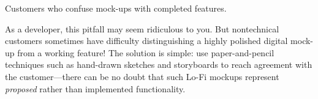 \begin{pitfall}{Customers who confuse mock-ups with completed features.}

As a developer, this pitfall may seem ridiculous to you.  But
nontechnical customers sometimes have difficulty distinguishing a highly
polished digital mock-up from a working feature!  The solution is simple: use
paper-and-pencil techniques such as hand-drawn sketches and storyboards to
reach agreement with the customer---there can be no doubt that such
Lo-Fi mockups represent \emph{proposed} rather than implemented
functionality.

\end{pitfall}
